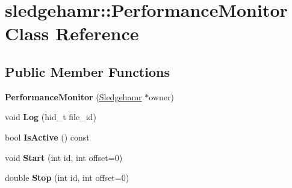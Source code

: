 \hypertarget{classsledgehamr_1_1PerformanceMonitor}{}\section{sledgehamr\+:\+:Performance\+Monitor Class Reference}
\label{classsledgehamr_1_1PerformanceMonitor}
\subsection*{Public Member Functions}
\begin{DoxyCompactItemize}
\item 
\mbox{\label{classsledgehamr_1_1PerformanceMonitor_ad7b69f01f4aee2a6af19b2c9884219f7}} 
{\bfseries Performance\+Monitor} (\mbox{\hyperlink{classsledgehamr_1_1Sledgehamr}{Sledgehamr}} $\ast$owner)
\item 
\mbox{\label{classsledgehamr_1_1PerformanceMonitor_acf6fc8fa972419ebb965329b21e7ea71}} 
void {\bfseries Log} (hid\+\_\+t file\+\_\+id)
\item 
\mbox{\label{classsledgehamr_1_1PerformanceMonitor_ac6485dabe5d83ae925cc235709c8250a}} 
bool {\bfseries Is\+Active} () const
\item 
\mbox{\label{classsledgehamr_1_1PerformanceMonitor_a6255de5ae44ed40a9fe157c587b75ece}} 
void {\bfseries Start} (int id, int offset=0)
\item 
\mbox{\label{classsledgehamr_1_1PerformanceMonitor_a5a4a8dab6ac29e38e11d6fc162d1337b}} 
double {\bfseries Stop} (int id, int offset=0)
\end{DoxyCompactItemize}
